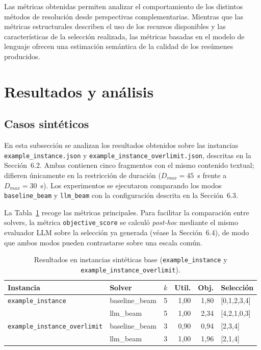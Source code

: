 \documentclass[12pt,a4paper]{article}
\begin{document}
Las métricas obtenidas permiten analizar el comportamiento de los distintos métodos de resolución desde perspectivas complementarias. Mientras que las métricas estructurales describen el uso de los recursos disponibles y las características de la selección realizada, las métricas basadas en el modelo de lenguaje ofrecen una estimación semántica de la calidad de los resúmenes producidos.


\section{Resultados y análisis}

\subsection{Casos sintéticos}

En esta subsección se analizan los resultados obtenidos sobre las instancias \texttt{example\_instance.json} y \texttt{example\_instance\_overlimit.json}, descritas en la Sección~6.2. Ambas contienen cinco fragmentos con el mismo contenido textual; difieren únicamente en la restricción de duración (\(D_{max}=45\)~s frente a \(D_{max}=30\)~s). Los experimentos se ejecutaron comparando los modos \texttt{baseline\_beam} y \texttt{llm\_beam} con la configuración descrita en la Sección~6.3.

La Tabla~\ref{tab:resultados_sinteticos} recoge las métricas principales. Para facilitar la comparación entre solvers, la métrica \texttt{objective\_score} se calculó \textit{post-hoc} mediante el mismo evaluador LLM sobre la selección ya generada (véase la Sección~6.4), de modo que ambos modos pueden contrastarse sobre una escala común.

\begin{table}[H]
\centering
\caption{Resultados en instancias sintéticas base (\texttt{example\_instance} y \texttt{example\_instance\_overlimit}).}
\label{tab:resultados_sinteticos}
\begin{tabular}{@{}llrrrl@{}}
\toprule
\textbf{Instancia} & \textbf{Solver} & \textbf{\(k\)} & \textbf{Util.} & \textbf{Obj.} & \textbf{Selección} \\
\midrule
\texttt{example\_instance}
& baseline\_beam & 5 & 1{,}00 & 1{,}80 & [0,1,2,3,4] \\
& llm\_beam      & 5 & 1{,}00 & 2{,}34 & [4,2,1,0,3] \\
\addlinespace
\texttt{example\_instance\_overlimit}
& baseline\_beam & 3 & 0{,}90 & 0{,}94 & [2,3,4] \\
& llm\_beam      & 3 & 1{,}00 & 1{,}96 & [2,1,4] \\
\bottomrule
\end{tabular}
\end{table}
\end{document}

